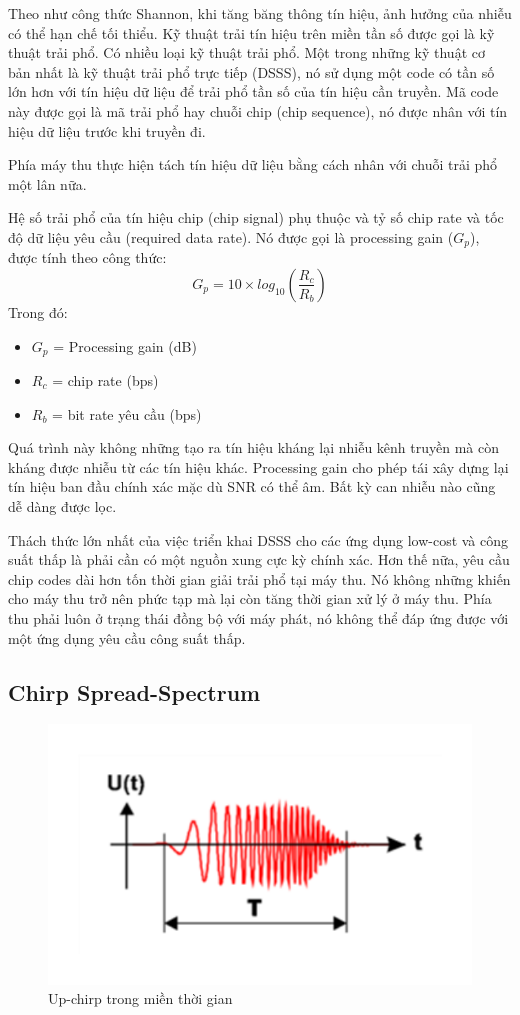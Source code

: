 	Theo như công thức Shannon, khi tăng băng thông tín hiệu, ảnh hưởng của nhiễu có thể hạn chế tối thiểu. Kỹ thuật trải tín hiệu trên miền tần số được gọi là kỹ thuật trải phổ. Có nhiều loại  kỹ thuật trải phổ. Một trong những kỹ thuật cơ bản nhất là kỹ thuật trải phổ trực tiếp (DSSS), nó sử dụng một code có tần số lớn hơn với tín hiệu dữ liệu để trải phổ tần số của tín hiệu cần truyền. Mã code này được gọi là mã trải phổ hay chuỗi chip (chip sequence), nó được nhân với tín hiệu dữ liệu trước khi truyền đi. \par 
	Phía máy thu thực hiện tách tín hiệu dữ liệu bằng cách nhân với chuỗi trải phổ một lân nữa. \par
	Hệ số trải phổ của tín hiệu chip (chip signal) phụ thuộc và tỷ số chip rate và tốc độ dữ liệu yêu cầu (required data rate). Nó được gọi là processing gain ($G_p$), được tính theo công thức:
	\begin{equation}
	G_p = 10 \times log_{10}(\frac{R_c}{R_b})
	\end{equation}
Trong đó: 
\begin{itemize}
\item	$G_p$  = Processing gain (dB) 
\item	$R_c$  = chip rate (bps) 
\item	$R_b$  = bit rate yêu cầu (bps) 
\end{itemize}
Quá trình này không những tạo ra tín hiệu kháng lại nhiễu kênh truyền mà còn kháng được nhiễu từ các tín hiệu khác. Processing gain cho phép tái xây dựng lại tín hiệu ban đầu chính xác mặc dù SNR có thể âm. Bất kỳ can nhiễu nào cũng dễ dàng được lọc. \par
	Thách thức lớn nhất của việc triển khai DSSS cho các ứng dụng low-cost và công suất thấp là phải cần có một nguồn xung cực kỳ chính xác. Hơn thế nữa, yêu cầu chip codes dài hơn tốn thời gian giải trải phổ tại máy thu. Nó không những khiến cho máy thu trở nên phức tạp mà lại còn tăng thời gian xử lý ở máy thu. Phía thu  phải luôn ở trạng thái đồng bộ với máy phát, nó không thể đáp ứng được với một ứng dụng yêu cầu công suất thấp.
	\subsection{Chirp Spread-Spectrum}
	\begin{figure}[h!] %
			\centering
			\includegraphics[width=0.5\linewidth]{./img/23.pdf}
			\caption{Up-chirp trong miền thời gian}
			\label{fig:fig23}
	\end{figure}
	
